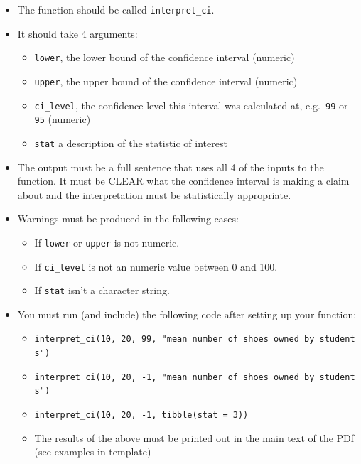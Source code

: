 \documentclass[
  openany]{book}
\providecommand{\tightlist}{%
  \setlength{\itemsep}{0pt}\setlength{\parskip}{0pt}}
\begin{document}
\begin{itemize}
\tightlist
\item
  The function should be called \texttt{interpret\_ci}.\\
\item
  It should take 4 arguments:

  \begin{itemize}
  \tightlist
  \item
    \texttt{lower}, the lower bound of the confidence interval (numeric)
  \item
    \texttt{upper}, the upper bound of the confidence interval (numeric)
  \item
    \texttt{ci\_level}, the confidence level this interval was calculated at, e.g.~\texttt{99} or \texttt{95} (numeric)
  \item
    \texttt{stat} a description of the statistic of interest\\
  \end{itemize}
\item
  The output must be a full sentence that uses all 4 of the inputs to the function. It must be CLEAR what the confidence interval is making a claim about and the interpretation must be statistically appropriate.\\
\item
  Warnings must be produced in the following cases:

  \begin{itemize}
  \tightlist
  \item
    If \texttt{lower} or \texttt{upper} is not numeric.
  \item
    If \texttt{ci\_level} is not an numeric value between 0 and 100.
  \item
    If \texttt{stat} isn't a character string.
  \end{itemize}
\item
  You must run (and include) the following code after setting up your function:

  \begin{itemize}
  \tightlist
  \item
    \texttt{interpret\_ci(10,\ 20,\ 99,\ "mean\ number\ of\ shoes\ owned\ by\ students")}
  \item
    \texttt{interpret\_ci(10,\ 20,\ -1,\ "mean\ number\ of\ shoes\ owned\ by\ students")}
  \item
    \texttt{interpret\_ci(10,\ 20,\ -1,\ tibble(stat\ =\ 3))}
  \item
    The results of the above must be printed out in the main text of the PDf (see examples in template)
  \end{itemize}
\end{itemize}
\end{document}
